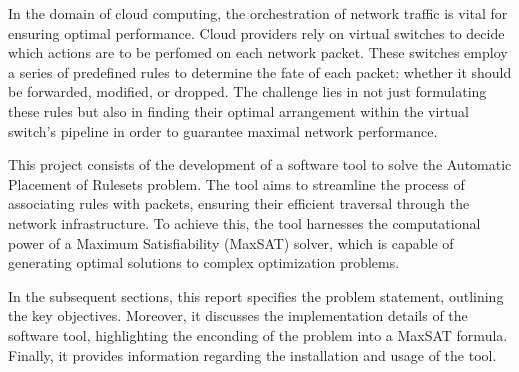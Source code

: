 In the domain of cloud computing, the orchestration of network traffic is vital for ensuring optimal performance. Cloud providers rely on virtual switches to decide which actions are to be perfomed on each network packet. These switches employ a series of predefined rules to determine the fate of each packet: whether it should be forwarded, modified, or dropped. The challenge lies in not just formulating these rules but also in finding their optimal arrangement within the virtual switch's pipeline in order to guarantee maximal network performance.

This project consists of the development of a software tool to solve the Automatic Placement of Rulesets problem. The tool aims to streamline the process of associating rules with packets, ensuring their efficient traversal through the network infrastructure. To achieve this, the tool harnesses the computational power of a Maximum Satisfiability (MaxSAT) solver, which is capable of generating optimal solutions to complex optimization problems.

In the subsequent sections, this report specifies the problem statement, outlining the key objectives. Moreover, it discusses the implementation details of the software tool, highlighting the enconding of the problem into a MaxSAT formula. Finally, it provides information regarding the installation and usage of the tool.